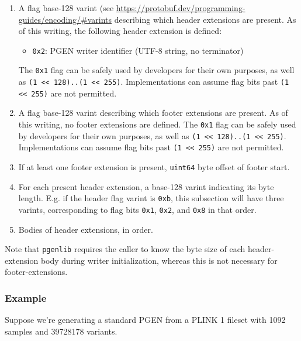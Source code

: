 \documentclass[8pt]{article}
\begin{document}
\begin{enumerate}
\item A flag base-128 varint (see
  \url{https://protobuf.dev/programming-guides/encoding/#varints} describing
  which header extensions are present.  As of this writing, the following
  header extension is defined:
  \begin{itemize}
    \item \texttt{0x2}: PGEN writer identifier (UTF-8 string, no terminator)
  \end{itemize}
  The \texttt{0x1} flag can be safely used by developers for their own
  purposes, as well as \texttt{(1 << 128)..(1 << 255)}.  Implementations can
  assume flag bits past \texttt{(1 << 255)} are not permitted.
\item A flag base-128 varint describing which footer extensions are present.
  As of this writing, no footer extensions are defined.  The \texttt{0x1} flag
  can be safely used by developers for their own purposes, as well as
  \texttt{(1 << 128)..(1 << 255)}.  Implementations can assume flag bits past
  \texttt{(1 << 255)} are not permitted.
\item If at least one footer extension is present, \texttt{uint64} byte offset
  of footer start.
\item For each present header extension, a base-128 varint indicating its byte
  length.  E.g. if the header flag varint is \texttt{0xb}, this subsection will
  have three varints, corresponding to flag bits \texttt{0x1}, \texttt{0x2},
  and \texttt{0x8} in that order.
\item Bodies of header extensions, in order.
\end{enumerate}

Note that \texttt{pgenlib} requires the caller to know the byte size of each
header-extension body during writer initialization, whereas this is not
necessary for footer-extensions.

\subsubsection{Example}

Suppose we're generating a standard PGEN from a PLINK 1 fileset with 1092
samples and 39728178 variants.
\end{document}
